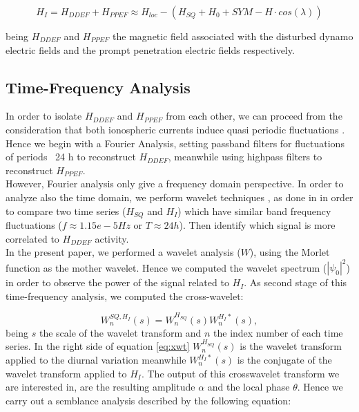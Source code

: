 \documentclass[a4paper]{article}
\theoremstyle{plain}
\theoremstyle{definition}
\begin{document}
	\begin{equation}
		H_I = H_{DDEF} + H_{PPEF} \approx H_{loc} - (H_{SQ} + H_0 + SYM-H \cdot cos(\lambda))
	\end{equation}
	
	\noindent being $H_{DDEF}$ and $H_{PPEF}$ the magnetic field associated with the disturbed dynamo electric fields and the prompt penetration electric fields respectively.\\
	
	
	\subsection{Time-Frequency Analysis}
	In order to isolate $H_{DDEF}$ and $H_{PPEF}$ from each other, we can proceed from the consideration that both ionospheric currents induce quasi periodic fluctuations \cite{nishida_68_fluctuations, blanc_ddyn, amory2020_filtros}. Hence we begin with a Fourier Analysis, setting passband filters for fluctuations of periods ~24 h to reconstruct $H_{DDEF}$, meanwhile using highpass filters to reconstruct $H_{PPEF}$.\\
	
	However, Fourier analysis only give a frequency domain perspective. In order to analyze also the time domain, we perform wavelet techniques \citep{APracticalGuidetoWaveletAnalysis}, as done in \cite{amory_younas2021} in order to compare two time series ($H_{SQ}$ and $H_I$) which have similar band frequency fluctuations ($f \approx 1.15e-5 Hz$ or $T \approx 24 h$). Then identify which signal is more correlated to $H_{DDEF}$ activity.\\
	
	In the present paper, we performed a wavelet analysis ($W$), using the Morlet function as the mother wavelet. Hence we computed the wavelet spectrum ($|\psi_0|^2$) in order to observe the power of the signal related to $H_I$. As second stage of this time-frequency analysis, we computed the cross-wavelet:
	
	\begin{equation}
		\label{eq:xwt}
		W_n^{SQ,H_I}(s) = W_n^{H_{SQ}}(s) W_n^{H_I *}(s),
	\end{equation}
	\noindent being $s$ the scale of the wavelet transform and $n$ the index number of each time series. In the right side of equation \ref{eq:xwt} $W_n^{H_{SQ}}(s)$ is the wavelet transform applied to the diurnal variation meanwhile $ W_n^{H_I *}(s)$ is the conjugate of the wavelet transform applied to $H_I$. The output of this crosswavelet transform we are interested in, are the resulting amplitude $\alpha$ and the local phase $\theta$. Hence we carry out a semblance analysis described by the following equation:
	
\end{document}
